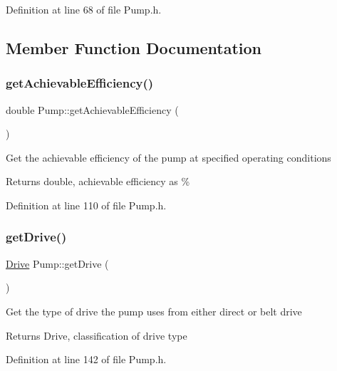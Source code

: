 Definition at line 68 of file Pump.\+h.



\subsection{Member Function Documentation}
\mbox{\label{class_pump_acf100af543142ab8404fc0ce2df1d157}} 
\subsubsection{\texorpdfstring{get\+Achievable\+Efficiency()}{getAchievableEfficiency()}}
{\footnotesize\ttfamily double Pump\+::get\+Achievable\+Efficiency (\begin{DoxyParamCaption}{ }\end{DoxyParamCaption})\hspace{0.3cm}{\ttfamily [inline]}}

Get the achievable efficiency of the pump at specified operating conditions \begin{DoxyReturn}{Returns}
double, achievable efficiency as \% 
\end{DoxyReturn}


Definition at line 110 of file Pump.\+h.

\mbox{\label{class_pump_a7eae412e42d0a3351408391cd5fbef4e}} 
\subsubsection{\texorpdfstring{get\+Drive()}{getDrive()}}
{\footnotesize\ttfamily \hyperlink{class_pump_a32bf0ade131a11bb3b3fb374f638e983}{Drive} Pump\+::get\+Drive (\begin{DoxyParamCaption}{ }\end{DoxyParamCaption})\hspace{0.3cm}{\ttfamily [inline]}}

Get the type of drive the pump uses from either direct or belt drive \begin{DoxyReturn}{Returns}
Drive, classification of drive type 
\end{DoxyReturn}


Definition at line 142 of file Pump.\+h.

